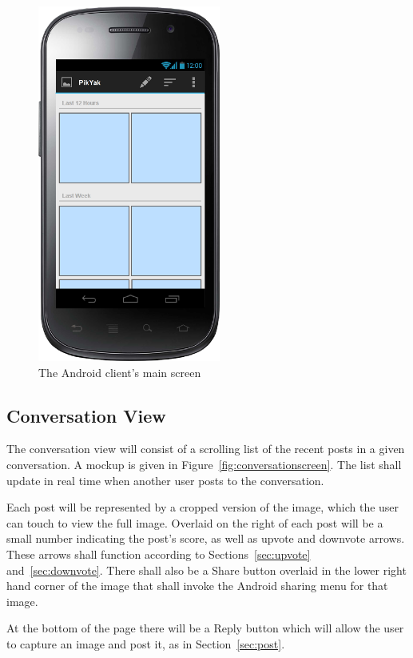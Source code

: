 \documentclass[11pt]{scrartcl}
\begin{document}
        \begin{figure}[h]
            \centering \includegraphics[width=6cm,keepaspectratio]{mockups/main}
            \caption{The Android client's main screen}
            \label{fig:mainscreen}
        \end{figure}

    \subsection{Conversation View}
    \label{sec:conversation}
        The conversation view will consist of a scrolling list of the recent posts in a given conversation.
        A mockup is given in Figure~\ref{fig:conversationscreen}.
        The list shall update in real time when another user posts to the conversation.

        Each post will be represented by a cropped version of the image, which the user can touch to view the full image.
        Overlaid on the right of each post will be a small number indicating the post's score, as well as upvote and downvote arrows.
        These arrows shall function according to Sections~\ref{sec:upvote} and~\ref{sec:downvote}.
        There shall also be a Share button overlaid in the lower right hand corner of the image that shall invoke the Android sharing menu for that image.

        At the bottom of the page there will be a Reply button which will allow the user to capture an image and post it, as in Section~\ref{sec:post}.
\end{document}
